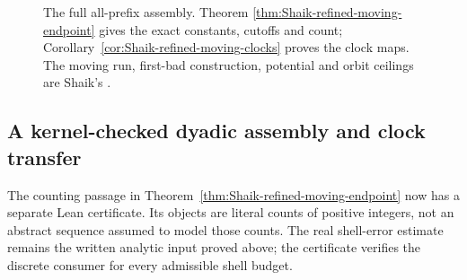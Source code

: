 \begin{figure}[ht]
\centering
{}
\caption{The full all-prefix assembly. Theorem
\ref{thm:Shaik-refined-moving-endpoint} gives the exact constants,
cutoffs and count; Corollary~\ref{cor:Shaik-refined-moving-clocks}
proves the clock maps. The moving run, first-bad construction,
potential and orbit ceilings are Shaik's \cite{Shaik2026v324}.}
\end{figure}

\subsection{A kernel-checked dyadic assembly and clock transfer}

The counting passage in Theorem~\ref{thm:Shaik-refined-moving-endpoint}
now has a separate Lean certificate. Its objects are literal counts of
positive integers, not an abstract sequence assumed to model those counts.
The real shell-error estimate remains the written analytic input proved
above; the certificate verifies the discrete consumer for every admissible
shell budget.

